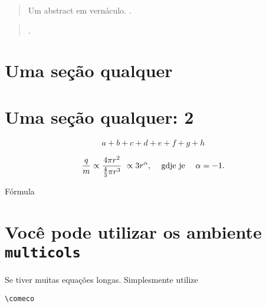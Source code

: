 \begin{primeirapagina}




	\begin{abstract}
Um abstract em vernáculo. \lipsum[1].

	\end{abstract}

	
	\begin{otherlanguage}{english}
	

	\begin{abstract}
\lipsum[1].
	
	\end{abstract}
	\end{otherlanguage}

	\end{primeirapagina}
\saythanks

\section{Uma seção qualquer}

\lipsum[1]

\section{Uma seção qualquer: 2}

\lipsum[1]

\begin{widetext}

  \begin{displaymath}
a + b + c + d + e + f + g + h
\end{displaymath}


\end{widetext}


\[
  \dfrac{q}{m} \propto \frac{4\pi{r^2}}{\frac{4}{3}\pi{r^3}}\
  \propto 3{r^\alpha}\text{, \quad gdje je\quad}\;\alpha = -1 \text{.}
\]

\lipsum[1-2]
Fórmula
\lipsum[1-20]

\section{Você pode utilizar os ambiente \texttt{multicols}}
Se tiver muitas equações longas. Simplesmente utilize 
\begin{verbatim} 
\comeco
\end{verbatim}

